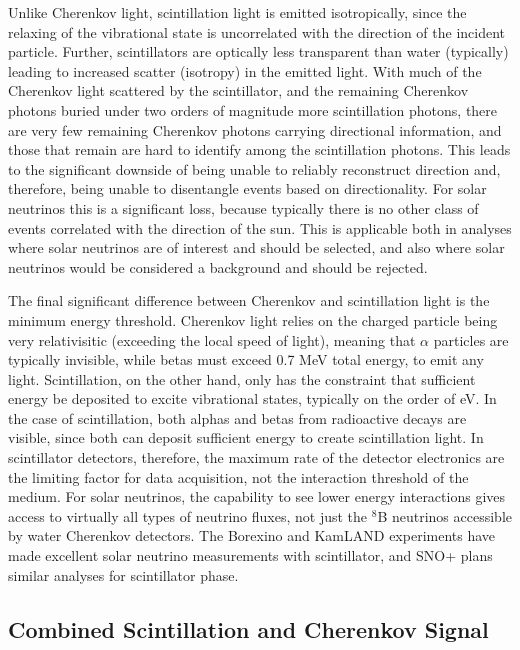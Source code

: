 Unlike Cherenkov light, scintillation light is emitted isotropically, since the relaxing of the vibrational state is uncorrelated with the direction of the incident particle.
Further, scintillators are optically less transparent than water (typically) leading to increased scatter (isotropy) in the emitted light.
With much of the Cherenkov light scattered by the scintillator, and the remaining Cherenkov photons buried under two orders of magnitude more scintillation photons, there are very few remaining Cherenkov photons carrying directional information, and those that remain are hard to identify among the scintillation photons.
This leads to the significant downside of being unable to reliably reconstruct direction and, therefore, being unable to disentangle events based on directionality. 
For solar neutrinos this is a significant loss, because typically there is no other class of events correlated with the direction of the sun.
This is applicable both in analyses where solar neutrinos are of interest and should be selected, and also where solar neutrinos would be considered a background and should be rejected.

The final significant difference between Cherenkov and scintillation light is the minimum energy threshold.
Cherenkov light relies on the charged particle being very relativisitic (exceeding the local speed of light), meaning that $\alpha$ particles are typically invisible, while betas must exceed 0.7 MeV total energy, to emit any light.
Scintillation, on the other hand, only has the constraint that sufficient energy be deposited to excite vibrational states, typically on the order of eV.
In the case of scintillation, both alphas and betas from radioactive decays are visible, since both can deposit sufficient energy to create scintillation light.
In scintillator detectors, therefore, the maximum rate of the detector electronics are the limiting factor for data acquisition, not the interaction threshold of the medium.
For solar neutrinos, the capability to see lower energy interactions gives access to virtually all types of neutrino fluxes, not just the $^8$B neutrinos accessible by water Cherenkov detectors.
The Borexino \cite{borexino} and KamLAND \cite{kamland} experiments have made excellent solar neutrino measurements with scintillator, and SNO+ plans similar analyses for scintillator phase.

\subsection{Combined Scintillation and Cherenkov Signal}

